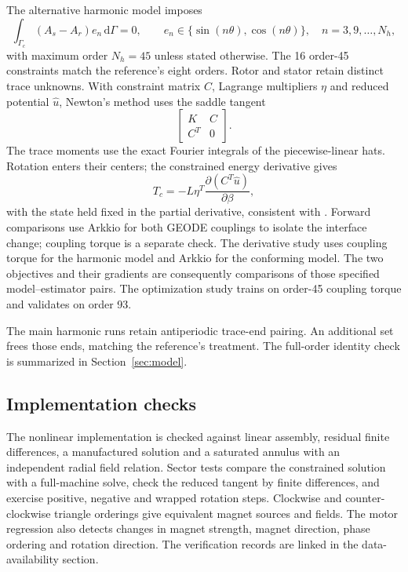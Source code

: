 \documentclass{anvil-paper}
\newcommand{\dd}{\,\mathrm{d}}
\begin{document}
The alternative harmonic model imposes
\begin{equation}
 \int_{\Gamma_c}(A_s-A_r)e_n\dd\Gamma=0,\qquad
 e_n\in\{\sin(n\theta),\cos(n\theta)\},\quad n=3,9,\ldots,N_h,
\end{equation}
with maximum order $N_h=45$ unless stated otherwise. The 16 order-45
constraints match the reference's eight orders. Rotor and stator
retain distinct trace unknowns. With constraint matrix $C$, Lagrange
multipliers $\eta$ and reduced potential $\hat u$, Newton's method uses
the saddle tangent
\begin{equation}
 \begin{bmatrix}K&C\\ C^T&0\end{bmatrix}.
\end{equation}
The trace moments use the exact Fourier integrals of the piecewise-linear
hats. Rotation enters their centers; the constrained energy derivative gives
\begin{equation}
 T_c=-L\eta^T\frac{\partial(C^T\hat u)}{\partial\beta},
 \label{eq:couplingtorque}
\end{equation}
with the state held fixed in the partial derivative, consistent with
\citet{egger2022torque}. Forward comparisons use Arkkio for both GEODE
couplings to isolate the interface change; coupling torque is a separate
check. The derivative study uses coupling torque for the harmonic model
and Arkkio for the conforming model. The two objectives and their gradients
are consequently comparisons of those specified model--estimator pairs.
The optimization study trains on order-45 coupling torque and validates on
order 93.

The main harmonic runs retain antiperiodic trace-end pairing. An additional
set frees those ends, matching the reference's treatment. The full-order
identity check is summarized in Section~\ref{sec:model}.

\subsection{Implementation checks}
The nonlinear implementation is checked against linear assembly, residual
finite differences, a manufactured solution and a saturated annulus with
an independent radial field relation. Sector tests compare the
constrained solution with a full-machine solve, check the reduced tangent
by finite differences, and exercise positive, negative and wrapped rotation
steps. Clockwise and counter-clockwise triangle orderings give equivalent
magnet sources and fields. The motor regression also detects changes in
magnet strength, magnet direction, phase ordering and rotation direction.
The verification records are linked in the data-availability section.
\end{document}
